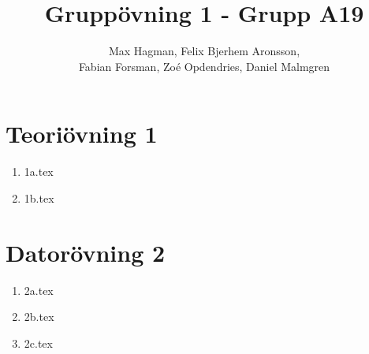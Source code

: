 \documentclass[a4paper]{report}
\title{Gruppövning 1 - Grupp A19}
\author{Max Hagman, Felix Bjerhem Aronsson,\\ Fabian Forsman, Zoé Opdendries, Daniel Malmgren}
\begin{document}
\maketitle

\section*{Teoriövning 1}
\begin{enumerate}[label=(\alph*)]
    \item {1a.tex}
    \clearpage
    \item {1b.tex}
\end{enumerate}
\section*{Datorövning 2}
\begin{enumerate}[label=(\alph*)]
    \item {2a.tex}
    \item {2b.tex}
    \item {2c.tex}
\end{enumerate}
\end{document}
